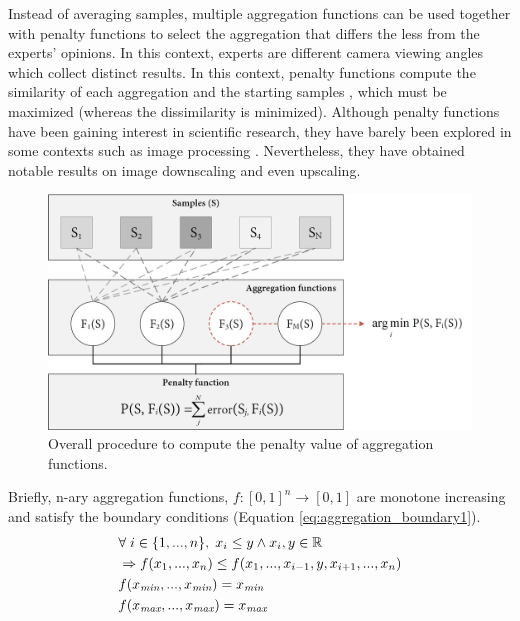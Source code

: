 Instead of averaging samples, multiple aggregation functions can be used together with penalty functions to select the aggregation that differs the less from the experts' opinions. In this context, experts are different camera viewing angles which collect distinct results. In this context, penalty functions compute the similarity of each aggregation and the starting samples \cite{bustince_definition_2017, bustince_penalty_2017}, which must be maximized (whereas the dissimilarity is minimized). Although penalty functions have been gaining interest in scientific research, they have barely been explored in some contexts such as image processing \cite{paternain_color_2012, paternain_construction_2015}. Nevertheless, they have obtained notable results on image downscaling and even upscaling.

\begin{figure}[ht]
	\includegraphics[width=.89\linewidth]{figs/fundamentals/penalty_functions.png}
	\caption{Overall procedure to compute the penalty value of aggregation functions.}
	\label{fig:penalty_funtions}
\end{figure}
Briefly, n-ary aggregation functions, $f: [0, 1]^n \rightarrow [0, 1]$ are monotone increasing and satisfy the boundary conditions (Equation \ref{eq:aggregation_boundary1}).  
\begin{gather}
    \begin{aligned}
        &\forall \hspace{1mm} i \in \{1,...,n\}, \hspace{1mm} x_i \leq y \land x_i, y \in \mathbb{R}\\
        &\Rightarrow f(x_1,...,x_n) \leq f(x_1,..., x_{i-1}, y, x_{i+1},...,x_n)\\
        &f(x_{\textit{min}},...,x_{\textit{min}}) = x_{\textit{min}}\\
        &f(x_{\textit{max}},...,x_{\textit{max}}) = x_{\textit{max}}
    \end{aligned}
    \label{eq:aggregation_boundary1}
\end{gather}

